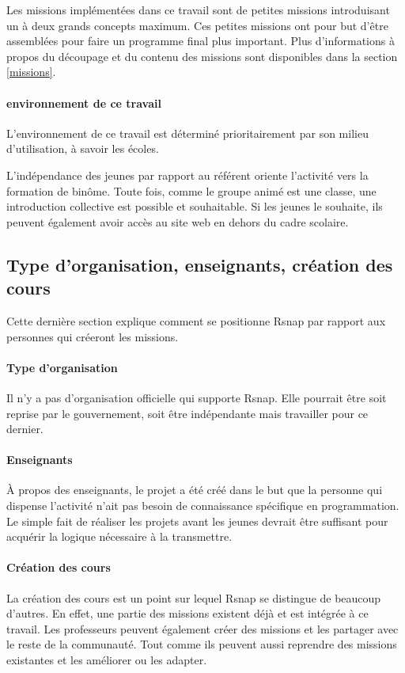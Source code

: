Les missions implémentées dans ce travail sont de petites missions introduisant un à deux grands concepts maximum. Ces petites missions ont pour but d'être assemblées pour faire un programme final plus important. Plus d'informations à propos du découpage et du contenu des missions sont disponibles dans la section \ref{missions}.

\paragraph{environnement de ce travail}
L'environnement de ce travail est déterminé prioritairement par son milieu d'utilisation, à savoir les écoles. 

L'indépendance des jeunes par rapport au référent oriente l'activité vers la formation de binôme. Toute fois, comme le groupe animé est une classe, une introduction collective est possible et souhaitable. 
Si les jeunes le souhaite, ils peuvent également avoir accès au site web en dehors du cadre scolaire.

\subsection{Type d'organisation, enseignants, création des cours}
Cette dernière section explique comment se positionne Rsnap par rapport aux personnes qui créeront les missions.

\paragraph{Type d'organisation}
Il n'y a pas d'organisation officielle qui supporte Rsnap. Elle pourrait être soit reprise par le gouvernement, soit être indépendante mais travailler pour ce dernier.

\paragraph{Enseignants}
À propos des enseignants, le projet a été créé dans le but que la personne qui dispense l'activité n'ait pas besoin de connaissance spécifique en programmation. Le simple fait de réaliser les projets avant les jeunes devrait être suffisant pour acquérir la logique nécessaire à la transmettre.

\paragraph{Création des cours}
La création des cours est un point sur lequel Rsnap se distingue de beaucoup d'autres. En effet, une partie des missions existent déjà et est intégrée à ce travail. Les professeurs peuvent également créer des missions et les partager avec le reste de la communauté. Tout comme ils peuvent aussi reprendre des missions existantes et les améliorer ou les adapter.

